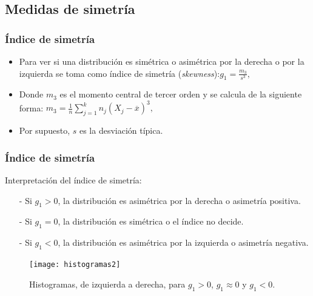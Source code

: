 \subsection{Medidas de simetría}

\begin{frame}
\frametitle{Índice de simetría}
\begin{itemize}
\item 
Para ver si una distribución es simétrica o asimétrica por la derecha o por la izquierda
se toma como índice de simetría (\textsl{skewness}):$g_1=\frac{m_3}{s^3},$
\item Donde $m_3$ es el momento central de tercer orden y se calcula de la siguiente forma:
$m_3=\frac{1}{n}\sum\limits_{j=1}^{k} n_j(X_j-\overline{x})^3,$
\item Por supuesto, $s$ es la desviación típica.
\end{itemize}
\end{frame}

\begin{frame}
\frametitle{Índice de simetría}
Interpretación del índice de simetría:
\begin{itemize}
\item[-] Si $g_1>0$, la distribución
es asimétrica por la derecha o asimetría positiva.
\item[-] Si $g_1=0$, la distribución
es simétrica o el  índice no decide.
\item[-] Si $g_1<0$, la distribución
es asimétrica por la izquierda o asimetría negativa.
\end{itemize}
\end{frame}

\begin{frame}
\begin{figure}
\begin{center}
\texttt{[image: histogramas2]}
\end{center} 
\caption{Histogramas, de izquierda a derecha, para $g_1>0$, $g_1\approx 0$ y $g_1<0$.}
\end{figure}
\end{frame}

